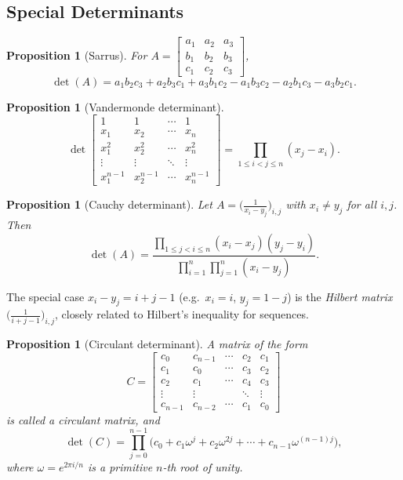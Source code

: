 \documentclass[12pt]{article}
\theoremstyle{breakplain}
\newtheorem{prop}[theorem]{Proposition}
\theoremstyle{breakdef}
\theoremstyle{remark}
\begin{document}
\subsection{Special Determinants}
\begin{prop}[Sarrus]
    For $A=\begin{bmatrix}
        a_1 & a_2 & a_3 \\
        b_1 & b_2 & b_3 \\
        c_1 & c_2 & c_3
    \end{bmatrix}$,
    \[\det(A)=a_1b_2c_3 + a_2b_3c_1+a_3b_1c_2-a_1b_3c_2 - a_2b_1c_3-a_3b_2c_1.\]
\end{prop}
\begin{prop}[Vandermonde determinant]\label{VD}
    \[\det\begin{bmatrix}
        1 & 1 &\cdots & 1 \\
        x_1 & x_2 & \cdots & x_n\\
        x_1^2 & x_2^2 & \cdots & x_n^2 \\
        \vdots & \vdots & \ddots & \vdots \\
        x_1^{n-1} & x_2^{n-1}& \cdots & x_n^{n-1}
    \end{bmatrix}=\prod_{1\leq i < j \leq n} (x_j-x_i).\]
\end{prop}
\begin{prop}[Cauchy determinant]
    Let $A=\big(\frac{1}{x_i-y_j}\big)_{i,j}$ with $x_i\neq y_j$ for all $i,j$. Then
    \[\det(A)=\frac{\prod_{1\leq j<i\leq n}(x_i-x_j)(y_j-y_i)}{\prod_{i=1}^n\prod_{j=1}^n(x_i-y_j)}.\]
\end{prop}
The special case $x_i-y_j=i+j-1$ (e.g.\ $x_i=i$, $y_j=1-j$) is the \emph{Hilbert matrix} $\big(\frac1{i+j-1}\big)_{i,j}$, closely related to Hilbert's inequality for sequences.
\begin{prop}[Circulant determinant]
    A matrix of the form
    \[C=\begin{bmatrix}
        c_0 & c_{n-1} & \cdots & c_2 & c_1\\
        c_1 & c_0 & \cdots & c_3 & c_2\\
        c_2 & c_1 &\cdots & c_4 & c_3\\
        \vdots & \vdots & & \ddots & \vdots \\
        c_{n-1} & c_{n-2} & \cdots & c_1 & c_0
    \end{bmatrix}\]
    is called a \emph{circulant matrix}, and
    \[\det(C)=\prod_{j=0}^{n-1}\big(c_0+c_1 \omega^j+c_2 \omega^{2j}+ \cdots +c_{n-1}\omega^{(n-1)j}\big),\]
    where $\omega=e^{2\pi i/n}$ is a primitive $n$-th root of unity.
\end{prop}
\end{document}
